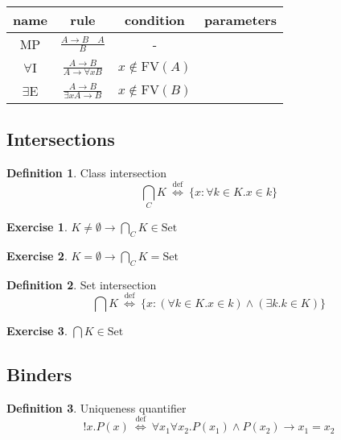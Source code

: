 \documentclass[10pt,a4paper]{article}
\theoremstyle{definition}
\newtheorem{definition}{Definition}[section]
\newtheorem{exercise}{Exercise}[section]
\newcommand{\defi}{{\textrm{def}}}
\newcommand{\propdef}{{\stackrel{\defi}{\ \Longleftrightarrow\ }}}
\newcommand{\inter}{{\bigcap}}
\newcommand{\interclass}{{{\bigcap}_C}}
\newcommand{\Set}{{\textrm{Set}}}
\begin{document}
\begin{table}[H]
\centering
\begin{tabular}{|c|c|c|c|}
\hline
name & rule & condition & parameters \\ \hline
\hline
MP &  \rule[-2.5ex]{0pt}{7ex} $\frac{A\to B\quad A}{B}$ & - \\ \hline %
\hline
\rule[-2.5ex]{0pt}{7ex}
$\forall$I & $\frac{A\to B}{A\to \forall x B}$ & $x \notin \textrm{FV}(A)$\\ \hline %
\hline
\rule[-2.5ex]{0pt}{7ex}
$\exists$E & $\frac{A\to B}{\exists x A\to B}$ & $x \notin \textrm{FV}(B)$\\ %
\hline
\end{tabular}
\end{table}

\subsection{Intersections}
\begin{definition} Class intersection
$$\interclass K \propdef \{x: \forall k\in K. x\in k\}$$
\end{definition}

\begin{exercise}
$K\neq \emptyset \to \interclass K \in \Set$
\end{exercise}

\begin{exercise}
$K=\emptyset \to \interclass K = \Set$
\end{exercise}

\begin{definition} Set intersection
$$\inter K \propdef \{x: (\forall k\in K. x\in k)\land (\exists k.k\in K)\}$$
\end{definition}

\begin{exercise}
$\inter K \in \Set$
\end{exercise}
\subsection{Binders}
\begin{definition} Uniqueness quantifier
$$!x. P(x) \propdef \forall x_1 \forall x_2. P(x_1)\land P(x_2)\to x_1=x_2$$
\end{definition}
\end{document}
